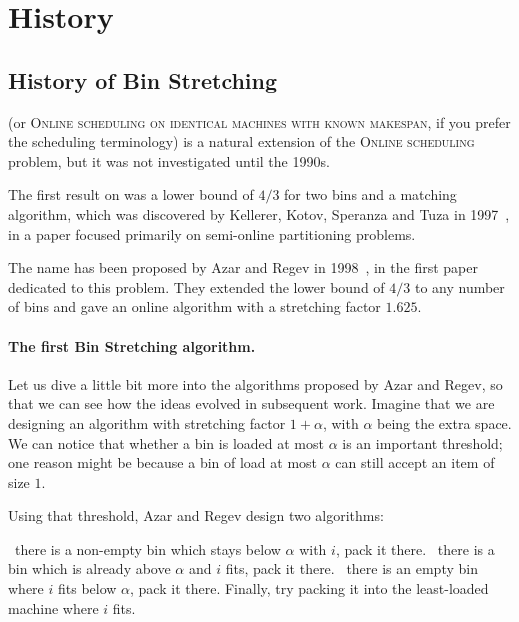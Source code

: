 \section{History}\label{sec:1:history}


\subsection{History of Bin Stretching}

\binstretch (or \textsc{Online scheduling on identical machines with
known makespan}, if you prefer the scheduling terminology) is a
natural extension of the \textsc{Online scheduling} problem, but it
was not investigated until the 1990s.

The first result on \binstretch was a lower bound of $4/3$ for two
bins and a matching algorithm, which was discovered by Kellerer,
Kotov, Speranza and Tuza in 1997~\cite{KeKoST97}, in a paper focused
primarily on semi-online partitioning problems.

The name \binstretch has been proposed by Azar and Regev in
1998~\cite{azar98,azar01}, in the first paper dedicated to this
problem. They extended the lower bound of $4/3$ to any number of bins
and gave an online algorithm with a stretching factor $1.625$.

\paragraph{The first Bin Stretching algorithm.} Let us dive a little
bit more into the algorithms proposed by Azar and Regev, so that we
can see how the ideas evolved in subsequent work. Imagine that we are designing
an algorithm with stretching factor $1+\alpha$, with $\alpha$ being the extra space.
We can notice that whether a bin is loaded at most $\alpha$ is an important threshold;
one reason might be because a bin of load at most $\alpha$ can still accept an item of size $1$.

Using that threshold, Azar and Regev design two algorithms:

\begin{algorithm}
\caption{}
\begin{algorithmic}[1]
\State \algorithmicif\ there is a non-empty bin which stays below $\alpha$ with $i$, pack it there.
\State \algorithmicif\ there is a bin which is already above $\alpha$ and $i$ fits, pack it there.
\State \algorithmicif\ there is an empty bin where $i$ fits below $\alpha$, pack it there.
\State Finally, try packing it into the least-loaded machine where $i$ fits.
\EndFor 
\end{algorithmic}
\end{algorithm}


